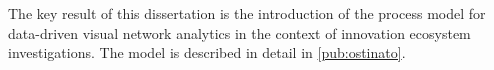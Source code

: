 
The key result of this dissertation is the introduction of the process model for data-driven visual network analytics in the context of innovation ecosystem investigations. The model is described in detail in \ref{pub:ostinato}.